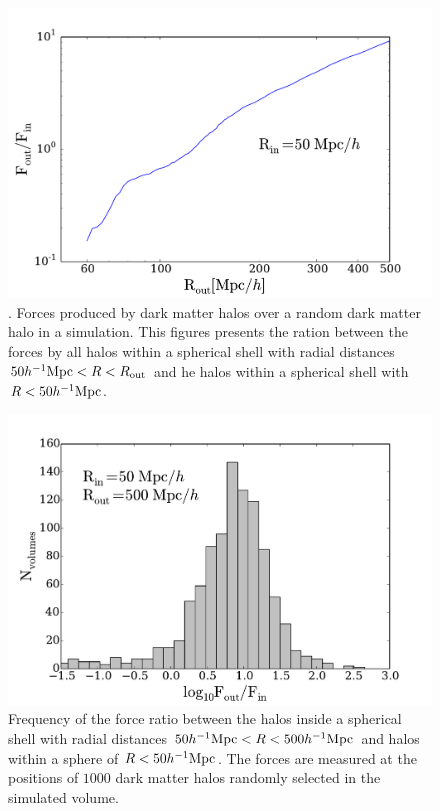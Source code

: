 \documentclass{article}
\newcommand{\hMpc}{{\ifmmode{h^{-1}{\rm Mpc}}\else{$h^{-1}$Mpc }\fi}}
\begin{document}
\begin{figure}
\begin{center}
\includegraphics[width=0.8\linewidth,angle=0]{spheres_nbody_radius_200_1000.pdf}
\caption{\label{fig:spheres_radius}. Forces produced by dark matter
  halos over a random dark matter halo in a simulation. This figures
  presents the ration between the forces by all halos within a
  spherical shell with radial distances $50\hMpc < R < R_{\rm out}$
  and he halos within a spherical shell with $R<50\hMpc$. } 
\end{center}
\end{figure}



\begin{figure}
\begin{center}
\includegraphics[width=0.8\linewidth,angle=0]{spheres_nbody_200_1000.pdf}
\caption{\label{fig:spheres_nbody} Frequency of the force ratio between
  the halos inside a spherical shell with radial distances $50\hMpc <
  R < 500\hMpc$ and halos within a sphere of $R<50\hMpc$. The forces
  are measured at the positions of $1000$ dark matter halos randomly
  selected in the simulated volume.}
\end{center}
\end{figure}




 
\end{document}
